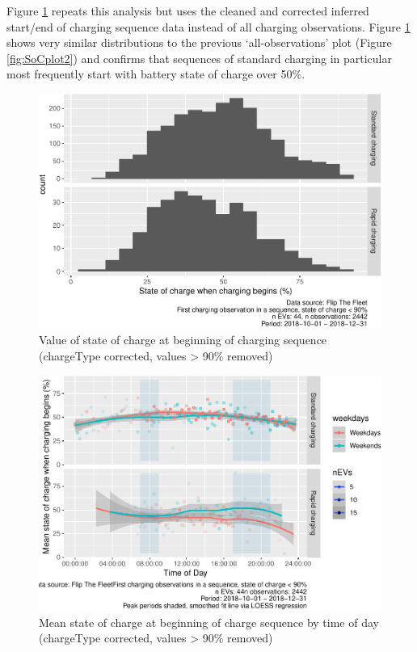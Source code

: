 \documentclass[]{article}
\begin{document}
Figure \ref{fig:SoCplot3} repeats this analysis but uses the cleaned and corrected inferred start/end of charging sequence data instead of all charging observations. Figure \ref{fig:SoCplot3} shows very similar distributions to the previous `all-observations' plot (Figure \ref{fig:SoCplot2}) and confirms that sequences of standard charging in particular most frequently start with battery state of charge over 50\%.

\begin{figure}
\centering
\includegraphics{EVBB_report_v1_files/figure-latex/SoCplot3-1.pdf}
\caption{\label{fig:SoCplot3}Value of state of charge at beginning of charging sequence (chargeType corrected, values \textgreater{} 90\% removed)}
\end{figure}

\begin{figure}
\centering
\includegraphics{EVBB_report_v1_files/figure-latex/SoCplotTiming-1.pdf}
\caption{\label{fig:SoCplotTiming}Mean state of charge at beginning of charge sequence by time of day (chargeType corrected, values \textgreater{} 90\% removed)}
\end{figure}
\end{document}
